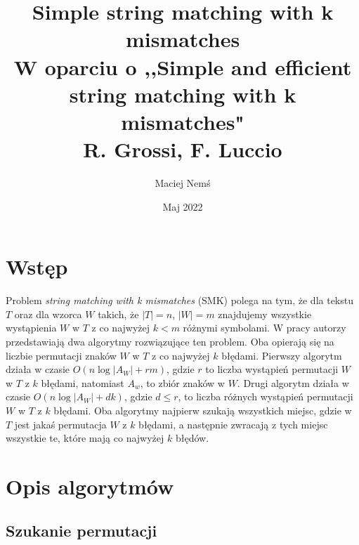 \documentclass[a4paper,11pt]{article}
\title{Simple string matching with k mismatches \\ \large W oparciu o ,,Simple and efficient string matching with k mismatches"\\ R. Grossi, F. Luccio}
\author{Maciej Nemś}
\date{Maj 2022}
\begin{document}
\maketitle

\section{Wstęp}
Problem \textit{string matching with k mismatches} (SMK) polega na tym, że dla tekstu $T$ oraz dla wzorca $W$ takich, że $|T| = n$, $|W| = m$ znajdujemy wszystkie wystąpienia $W$ w $T$ z co najwyżej $k < m$ różnymi symbolami. W pracy autorzy przedstawiają dwa algorytmy rozwiązujące ten problem. Oba opierają się na liczbie permutacji znaków $W$ w $T$ z co najwyżej $k$ błędami. Pierwszy algorytm działa w czasie $O(n\log|A_W|+rm)$, gdzie $r$ to liczba wystąpień permutacji $W$ w $T$ z $k$ błędami, natomiast $A_w$, to zbiór znaków w $W$. Drugi algorytm działa w czasie $O(n\log|A_W| +dk)$, gdzie $d \leq r$, to liczba różnych wystąpień permutacji $W$ w $T$ z $k$ błędami. Oba algorytmy najpierw szukają wszystkich miejsc, gdzie w $T$ jest jakaś permutacja $W$ z $k$ błędami, a następnie zwracają z tych miejsc wszystkie te, które mają co najwyżej $k$ błędów.

\section{Opis algorytmów}

\subsection{Szukanie permutacji}
\end{document}
